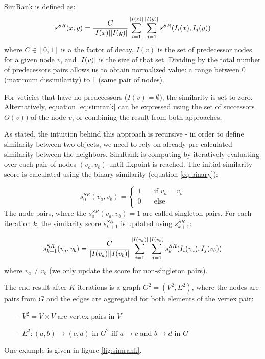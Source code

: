 SimRank is defined as:
\begin{equation}
	s^{SR}(x,y) = \dfrac{C}{\arrowvert I(x)\arrowvert \arrowvert I(y)\arrowvert}
	\sum_{i=1}^{\arrowvert I(x)\arrowvert}
	\sum_{j=1}^{\arrowvert I(y)\arrowvert}s^{SR}(I_{i}(x), I_{j}(y))
	\label{eq:simrank}
\end{equation}
where $C \in [0,1]$ is a the factor of decay, $I(v)$ is the set of predecessor nodes for a given node $v$, 
and $\arrowvert I(v)\arrowvert$ is the size of that set.
Dividing by the total number of predecessors pairs allows us to obtain normalized value: 
a range between 0 (maximum dissimilarity) to 1 (same pair of nodes). 

For veticies that have no predecessors ($I(v)=\emptyset$), the similarity is set to zero.
Alternatively, equation \ref{eq:simrank} can be expressed using the set of successors $O(v))$ of the node $v$,
or combining the result from both approaches.

As stated, the intuition behind this approach is recursive - 
in order to define similarity between two objects, we need to rely on already pre-calculated similarity between the neighbors.
SimRank is computing by iteratively evaluating over each pair of nodes $(v_{a},v_{b})$ until fixpoint is reached. 
The initial similarity score is  calculated using the binary similarity (equation \ref{eq:binary}):

\begin{equation}
	s_{0}^{SR}(v_{a},v_{b}) = \begin{cases}
	1  & \quad \text{if } v_{a}=v_{b} \\
	0  & \quad \text{else }\\
	\end{cases}
\end{equation}
The node pairs, where the $s_{0}^{SR}(v_{a},v_{b})=1$ are called singleton pairs.
For each iteration $k$, the similarity score $s_{k+1}^{SR}$ is updated using $s_{k+1}^{SR}$:

\begin{equation}
	s_{k+1}^{SR}(v_{a},v_{b})= \dfrac{C}{\arrowvert I(v_{a})\arrowvert \arrowvert I(v_{b})\arrowvert}
	\sum_{i=1}^{\arrowvert I(v_{a})\arrowvert}\sum_{j=1}^{\arrowvert I(v_{b})}s_{k}^{SR}(I_{i}(v_{a}), I_{j}(v_{b}))
\end{equation}
where $v_{a}\neq v_{b}$ (we only update the score for non-singleton pairs).

The end result after $K$ iterations is a graph $G^{2} = (V^{2},E^{2})$, where the nodes are pairs from $G$
and the edges are aggregated for both elements of the vertex pair:
\begin{itemize}
	\item[--] $V^{2} = V\times V$ are vertex pairs in $V$
	\item[--] $E^{2}:(a,b) \rightarrow (c,d)$ in $G^{2}$ iff $a\rightarrow c$ and $b\rightarrow d$ in $G$
\end{itemize}
One example is given in figure \ref{fig:simrank}.


